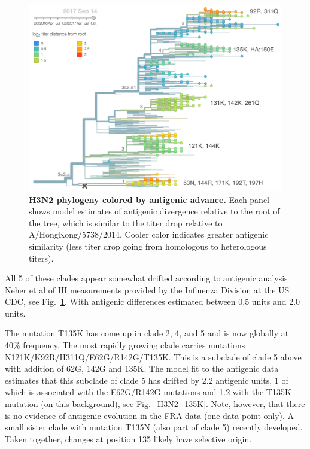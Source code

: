 \documentclass[11pt,oneside,letterpaper]{article}
\newcommand{\FIG}[1]{Fig.~\ref{#1}}
\begin{document}
\clearpage
\begin{figure}[h!]
  \centering
  \includegraphics[width=1.0\textwidth]{../figures/sep-2017/h3n2_tree_titer_model.png}
  \caption{\textbf{H3N2 phylogeny colored by antigenic advance.}
  Each panel shows model estimates of antigenic divergence relative to the root of the tree, which is similar to the titer drop relative to A/HongKong/5738/2014.
  Cooler color indicates greater antigenic similarity (less titer drop going from homologous to heterologous titers).
  }
  \label{H3N2_tree_titer_model}
\end{figure}


All 5 of these clades appear somewhat drifted according to antigenic
analysis Neher et al \cite{neher2015prediction} of HI measurements provided by the Influenza Division at the US CDC, see \FIG{H3N2_tree_titer_model}.
With antigenic differences estimated between 0.5 units and 2.0 units.


The mutation T135K has come up in clade 2, 4, and 5 and is now globally
at 40\% frequency. The most rapidly growing clade carries mutations
N121K/K92R/H311Q/E62G/R142G/T135K. This is a subclade of clade 5 above
with addition of 62G, 142G and 135K. The model fit to the antigenic data
estimates that this subclade of clade 5 has drifted by 2.2 antigenic
units, 1 of which is associated with the E62G/R142G mutations and 1.2
with the T135K mutation (on this background), see \FIG{H3N2_135K}.
Note, however, that there
is no evidence of antigenic evolution in the FRA data (one data point
only). A small sister clade with mutation T135N (also part of clade 5)
recently developed. Taken together, changes at position 135 likely have
selective origin.
\end{document}
